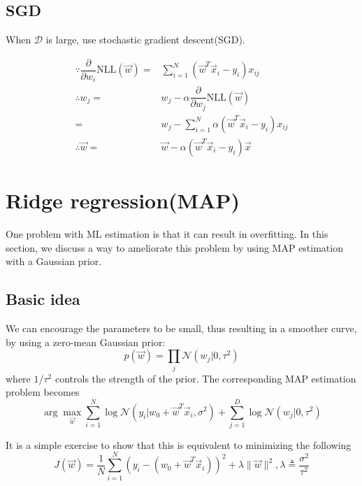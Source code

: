 \subsection{SGD}
When $\mathcal{D}$ is large, use stochastic gradient descent(SGD).

\begin{align}
\because \dfrac{\partial}{\partial w_i}\text{NLL}(\vec{w})=& \sum\limits_{i=1}^N (\vec{w}^T\vec{x}_i-y_i)x_{ij} \\
\therefore w_j=& w_j - \alpha\dfrac{\partial}{\partial w_j}\text{NLL}(\vec{w}) \nonumber \\
                  =& w_j - \sum\limits_{i=1}^N \alpha(\vec{w}^T\vec{x}_i-y_i)x_{ij} \\
\therefore \vec{w}=& \vec{w}-\alpha(\vec{w}^T\vec{x}_i-y_i)\vec{x}
\end{align}


\section{Ridge regression(MAP)}
One problem with ML estimation is that it can result in overfitting. In this section, we discuss a way to ameliorate this problem by using MAP estimation with a Gaussian prior.


\subsection{Basic idea}
We can encourage the parameters to be small, thus resulting in a smoother curve, by using a zero-mean Gaussian prior:
\begin{equation}
p(\vec{w})=\prod\limits_j \mathcal{N}(w_j|0,\tau^2)
\end{equation}
where $1/\tau^2$ controls the strength of the prior. The corresponding MAP estimation problem becomes
\begin{equation}
\arg\max_{\vec{w}} \sum\limits_{i=1}^N \log{\mathcal{N}(y_i|w_0+\vec{w}^T\vec{x}_i,\sigma^2)}+\sum\limits_{j=1}^D \log{\mathcal{N}(w_j|0,\tau^2)}
\end{equation}

It is a simple exercise to show that this is equivalent to minimizing the following
\begin{equation}\label{eqn:Ridge-regression-J}
J(\vec{w})=\dfrac{1}{N}\sum\limits_{i=1}^N (y_i-(w_0+\vec{w}^T\vec{x}_i))^2+\lambda\lVert\vec{w}\rVert^2 , \lambda \triangleq \dfrac{\sigma^2}{\tau^2}
\end{equation}

